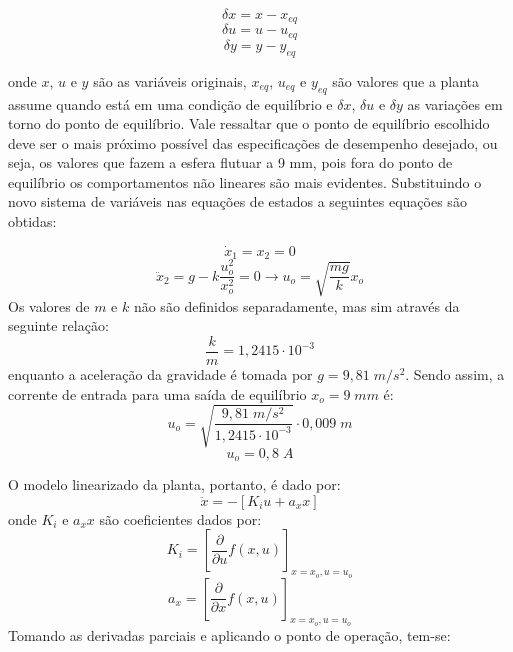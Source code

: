 \documentclass{ifacconf}
\begin{document}
\begin{equation}
    \delta x = x - x_{eq}
\end{equation}
\begin{equation}
    \delta u = u - u_{eq}
\end{equation}
\begin{equation}
    \delta y = y - y_{eq}
\end{equation}

\noindent onde $x$, $u$ e $y$ são as variáveis originais, $x_{eq}$, $u_{eq}$ e $y_{eq}$ são valores que a planta assume quando está em uma condição de equilíbrio e $\delta x$, $\delta u$ e $\delta y$ as variações em torno do ponto de equilíbrio. Vale ressaltar que o ponto de equilíbrio escolhido deve ser o mais próximo possível das especificações de desempenho desejado, ou seja, os valores que fazem a esfera flutuar a 9 mm, pois fora do ponto de equilíbrio os comportamentos não lineares são mais evidentes. Substituindo o novo sistema de variáveis nas equações de estados a seguintes equações são obtidas:

\begin{equation}
    \dot{x}_1 = x_2 = 0
\end{equation}
\begin{equation}
    \ddot{x}_2 = g - k \frac{u_o^2}{x_o^2} = 0 \rightarrow u_o = \sqrt{\frac{mg}{k}}x_o
\end{equation}
Os valores de $m$ e $k$ não são definidos separadamente, mas sim através da seguinte relação:
\begin{equation}
    \frac{k}{m} = 1,2415 \cdot 10^{-3}
\end{equation}
\noindent enquanto a aceleração da gravidade é tomada por $g = 9,81 \; m/s^2$. Sendo assim, a corrente de entrada para uma saída de equilíbrio $x_o = 9\;mm$ é:
\begin{equation}
    u_o = \sqrt{\frac{9,81\;m/s^2}{1,2415 \cdot 10^{-3}}} \cdot 0,009\;m
\end{equation}
\begin{equation}
    u_o = 0,8\;A
\end{equation}

O modelo linearizado da planta, portanto, é dado por:
\begin{equation}
    \ddot{x} = -[K_i u + a_x x]
\end{equation}
onde $K_i$ e $a_x x$ são coeficientes dados por:
\begin{equation}
    K_i = [\frac{\partial}{\partial u}f(x,u)]_{x = x_o, u = u_o}
\end{equation}
\begin{equation}
    a_x = [\frac{\partial}{\partial x}f(x,u)]_{x = x_o, u = u_o}
\end{equation}
Tomando as derivadas parciais e aplicando o ponto de operação, tem-se:
\end{document}
